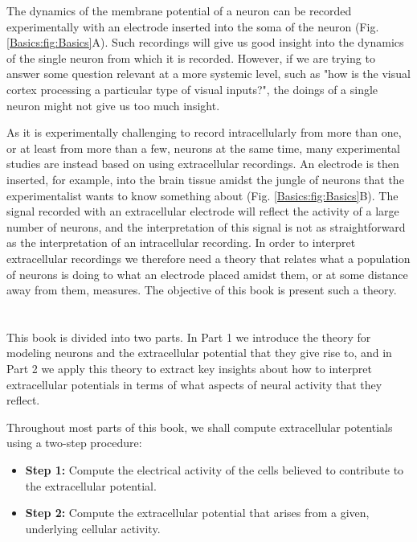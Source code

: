The dynamics of the membrane potential of a neuron can be recorded experimentally with an electrode inserted into the soma of the neuron (Fig. \ref{Basics:fig:Basics}A). Such recordings will give us good insight into the dynamics of the single neuron from which it is recorded. However, if we are trying to answer some question relevant at a more systemic level, such as "how is the visual cortex processing a particular type of visual inputs?", the doings of a single neuron might not give us too much insight.

As it is experimentally challenging to record intracellularly from more than one, or at least from more than a few, neurons at the same time, many experimental studies are instead based on using extracellular recordings. An electrode is then inserted, for example, into the brain tissue amidst the jungle of neurons that the experimentalist wants to know something about (Fig. \ref{Basics:fig:Basics}B). The signal recorded with an extracellular electrode will reflect the activity of a large number of neurons, and the interpretation of this signal is not as straightforward as the interpretation of an intracellular recording. In order to interpret extracellular recordings we therefore need a theory that relates what a population of neurons is doing to what an electrode placed amidst them, or at some distance away from them, measures. The objective of this book is present such a theory.





\section{}
This book is divided into two parts. In Part 1 we introduce the theory for modeling neurons and the extracellular potential that they give rise to, and in Part 2 we apply this theory to extract key insights about how to interpret extracellular potentials in terms of what aspects of neural activity that they reflect.

Throughout most parts of this book, we shall compute extracellular potentials using a two-step procedure:

\begin{itemize}
\item {\bf Step 1:} Compute the electrical activity of the cells believed to contribute to the extracellular potential.
\item {\bf Step 2:} Compute the extracellular potential that arises from a given, underlying cellular activity.
\end{itemize}

